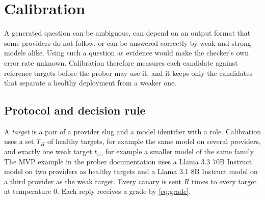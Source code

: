 \section{Calibration}
\label{sec:calibration}

A generated question can be ambiguous, can depend on an output format that some
providers do not follow, or can be answered correctly by weak and strong models
alike. Using such a question as evidence would make the checker's own error
rate unknown. Calibration therefore measures each candidate against reference
targets before the prober may use it, and it keeps only the candidates that
separate a healthy deployment from a weaker one.

\subsection{Protocol and decision rule}
\label{sec:calibration_rule}

A \emph{target} is a pair of a provider slug and a model identifier with a
role. Calibration uses a set $T_H$ of healthy targets, for example the same
model on several providers, and exactly one weak target $t_w$, for example a
smaller model of the same family. The MVP example in the prober documentation
uses a Llama 3.3 70B Instruct model on two providers as healthy targets and a
Llama 3.1 8B Instruct model on a third provider as the weak target. Every
canary is sent $R$ times to every target at temperature $0$. Each reply
receives a grade by \eqref{eq:grade}.

